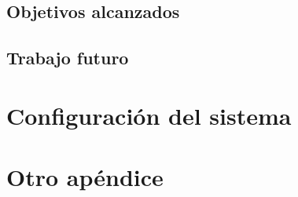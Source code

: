 \documentclass[11pt,spanish,listoffigures,listoftables]{tfgetsinf}
\begin{document}
\section{Objetivos alcanzados}         %

\section{Trabajo futuro}               %


\printbibliography 
\cleardoublepage


\APPENDIX

\chapter{Configuración del sistema}

\chapter{Otro apéndice}
\end{document}
